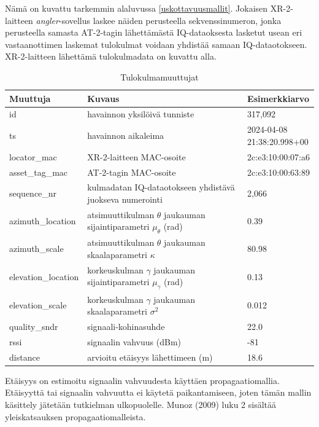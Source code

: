 \documentclass[
  12pt,
  a4paper, twoside]{book}
\begin{document}
Nämä on kuvattu tarkemmin alaluvussa \ref{uskottavuusmallit}. Jokaisen XR-2-laitteen \emph{angler}-sovellus laskee näiden perusteella sekvenssinumeron, jonka perusteella samasta AT-2-tagin lähettämästä IQ-dataoksesta lasketut usean eri vastaanottimen laskemat tulokulmat voidaan yhdistää samaan IQ-dataotokseen. XR-2-laitteen lähettämä tulokulmadata on kuvattu alla.

\def\arraystretch{1.25} 
\begin{table}[H]
\centering
\begin{tabular}{|l|l|l|}
\hline
Muuttuja & Kuvaus & Esimerkkiarvo\\
\hline
id & havainnon yksilöivä tunniste & 317,092 \\
ts & havainnon aikaleima & \makecell[l]{2024-04-08 \\ 21:38:20.998+00}\\
locator\_mac & XR-2-laitteen MAC-osoite & 2c:e3:10:00:07:a6
\\
asset\_tag\_mac & AT-2-tagin MAC-osoite & 2c:e3:10:00:63:89\\
sequence\_nr & \makecell[l]{kulmadatan IQ-dataotokseen yhdistävä \\ juokseva numerointi} & 2,066\\
azimuth\_location & \makecell[l]{atsimuuttikulman $\theta$ \\ jaukauman sijaintiparametri $\mu_{\theta}$ (rad)} & 0.39
\\
azimuth\_scale & \makecell[l]{atsimuuttikulman $\theta$ \\ jaukauman skaalaparametri $\kappa$} & 80.98
\\
elevation\_location & \makecell[l]{korkeuskulman $\gamma$ \\ jaukauman sijaintiparametri $\mu_{\gamma}$ (rad)} & 0.13
\\
elevation\_scale & \makecell[l]{korkeuskulman $\gamma$ \\ jaukauman skaalaparametri $\sigma^2$} & 0.012
\\
quality\_sndr & signaali-kohinasuhde & 22.0 \\
rssi & signaalin vahvuus (dBm) & -81\\
distance & arvioitu etäisyys lähettimeen (m) & 18.6\\
\hline
\end{tabular}
\caption{Tulokulmamuuttujat}
\label{tab:aoa-muuttujat}
\end{table}

Etäisyys on estimoitu signaalin vahvuudesta käyttäen propagaatiomallia. Etäisyyttä tai signaalin vahvuutta ei käytetä paikantamiseen, joten tämän mallin käsittely jätetään tutkielman ulkopuolelle. Munoz (2009) luku 2 sisältää yleiskatsauksen propagaatiomalleista. \citep{Munoz-2009}
\end{document}
